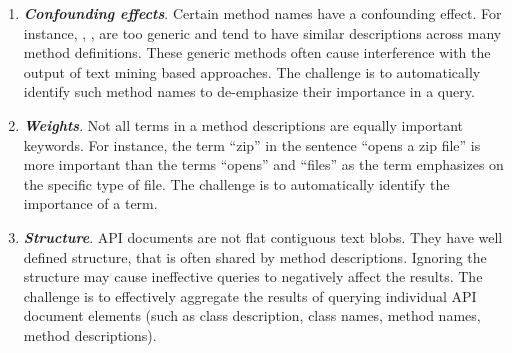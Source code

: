 \begin{enumerate}
		
	\item \textbf{\textit{Confounding effects}}. Certain method names have a confounding effect. For instance, , ,  are too generic and tend to have similar descriptions across many method definitions. These generic methods often cause interference with the output of text mining based approaches. The challenge is to automatically identify such method names to de-emphasize their importance in a query. 
	
	\item \textbf{\textit{Weights}}. Not all terms in a method descriptions are equally important keywords. For instance, the term ``zip'' in the sentence ``opens a zip file'' is more important than the terms ``opens'' and ``files'' as the term emphasizes on the specific type of file. The challenge is to automatically identify the importance of a term.
	
	\item \textbf{\textit{Structure}}. API documents are not flat contiguous text blobs. They have well defined structure, that is often shared by method descriptions. Ignoring the structure may cause ineffective queries to negatively affect the results. The challenge is to effectively aggregate the results of querying individual API document elements (such as class description, class names, method names, method descriptions).
			
	
\end{enumerate}
